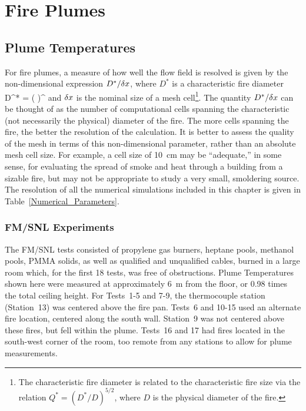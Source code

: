 
\chapter{Fire Plumes}

\section{Plume Temperatures}

For fire plumes, a measure of how well the flow field is resolved is given by the non-dimensional expression $D^*/\delta x$, where $D^*$ is a characteristic
fire diameter
\be
   D^* = \left(
     \right)^
\ee
and $\delta x$ is the nominal size of a mesh cell\footnote{The characteristic fire diameter is related to the characteristic fire size via the relation $Q^* = (D^*/D)^{5/2}$, where $D$ is the physical diameter of the fire.}. The quantity $D^*/\delta x$ can be thought of as the number of computational cells spanning the characteristic (not necessarily the physical) diameter of the fire. The more cells spanning the fire, the better the resolution of the calculation. It is better to assess the quality of the mesh in terms of this non-dimensional parameter, rather than an absolute mesh cell size. For example, a cell size of 10~cm may be ``adequate,'' in some sense, for evaluating the spread of smoke and heat through a building from a sizable fire, but may not be appropriate to study a very small, smoldering source. The resolution of all the numerical simulations included in this chapter is given in Table~\ref{Numerical_Parameters}.

\clearpage

\subsection{FM/SNL Experiments}

\label{FM/SNL_Plume}

The FM/SNL tests consisted of propylene gas burners, heptane pools, methanol pools, PMMA solids, as well as qualified and unqualified cables, burned in a large room which, for the first 18 tests, was free of obstructions. Plume Temperatures shown here were measured at approximately 6~m from the floor, or 0.98 times the total ceiling height. For Tests~1-5 and 7-9, the thermocouple station (Station~13) was centered above the fire pan. Tests~6 and 10-15 used an alternate fire location, centered along the south wall. Station~9 was not centered above these fires, but fell within the plume. Tests~16 and 17 had fires located in the south-west corner of the room, too remote from any stations to allow for plume measurements.

